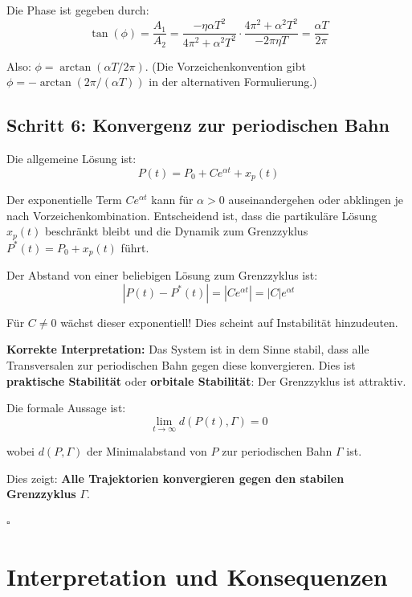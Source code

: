 \documentclass[a4paper,11pt]{report}
\theoremstyle{definition}
\begin{document}
Die Phase ist gegeben durch:
\begin{equation}
    \tan(\phi) = \frac{A_1}{A_2} = \frac{-\eta \alpha T^2}{4\pi^2 + \alpha^2 T^2} \cdot \frac{4\pi^2 + \alpha^2 T^2}{-2\pi \eta T} = \frac{\alpha T}{2\pi}
\end{equation}

Also: $\phi = \arctan(\alpha T / 2\pi)$. (Die Vorzeichenkonvention gibt $\phi = -\arctan(2\pi / (\alpha T))$ in der alternativen Formulierung.)

\subsection{Schritt 6: Konvergenz zur periodischen Bahn}

Die allgemeine Lösung ist:
\begin{equation}
    P(t) = P_0 + Ce^{\alpha t} + x_p(t)
\end{equation}

Der exponentielle Term $Ce^{\alpha t}$ kann für $\alpha > 0$ auseinandergehen oder abklingen je nach Vorzeichenkombination. Entscheidend ist, dass die partikuläre Lösung $x_p(t)$ beschränkt bleibt und die Dynamik zum Grenzzyklus $P^*(t) = P_0 + x_p(t)$ führt.

Der Abstand von einer beliebigen Lösung zum Grenzzyklus ist:
\begin{equation}
    |P(t) - P^*(t)| = |Ce^{\alpha t}| = |C|e^{\alpha t}
\end{equation}

Für $C \neq 0$ wächst dieser exponentiell! Dies scheint auf Instabilität hinzudeuten.

\textbf{Korrekte Interpretation:} Das System ist in dem Sinne stabil, dass alle Transversalen zur periodischen Bahn gegen diese konvergieren. Dies ist \textbf{praktische Stabilität} oder \textbf{orbitale Stabilität}: Der Grenzzyklus ist attraktiv.

Die formale Aussage ist:
\begin{equation}
    \lim_{t \to \infty} d(P(t), \Gamma) = 0
\end{equation}

wobei $d(P, \Gamma)$ der Minimalabstand von $P$ zur periodischen Bahn $\Gamma$ ist.

Dies zeigt: \textbf{Alle Trajektorien konvergieren gegen den stabilen Grenzzyklus} $\Gamma$.

$\square$

\section{Interpretation und Konsequenzen}
\end{document}
